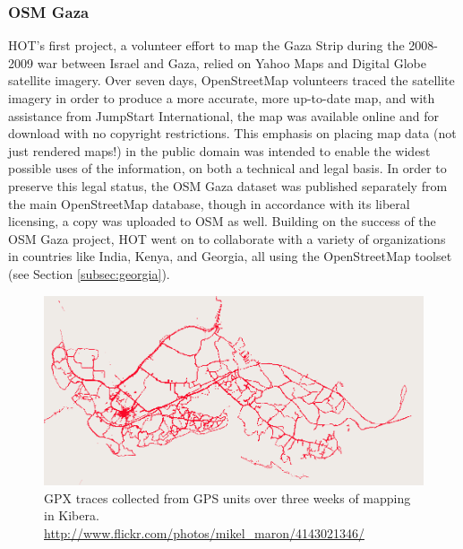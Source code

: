 \documentclass[11pt,oneside,notitlepage]{report}
\begin{document}
{{\subsubsection{OSM Gaza}

\ac{HOT}'s first project, a volunteer effort to map the Gaza Strip during the 2008-2009 war between Israel and Gaza, relied on Yahoo Maps and Digital Globe satellite imagery. Over seven days, OpenStreetMap volunteers traced the satellite imagery in order to produce a more accurate, more up-to-date map, and with assistance from JumpStart International, the map was available online and for download with no copyright restrictions. \cite{chilton-crowdsourcing} This emphasis on placing map data (not just rendered maps!) in the public domain was intended to enable the widest possible uses of the information, on both a technical and legal basis. In order to preserve this legal status, the OSM Gaza dataset was published separately from the main OpenStreetMap database, though in accordance with its liberal licensing, a copy was uploaded to OSM as well. Building on the success of the OSM Gaza project, \ac{HOT} went on to collaborate with a variety of organizations in countries like India, Kenya, and Georgia, all using the OpenStreetMap toolset (see Section \ref{subsec:georgia}). 

\begin{figure}[h]
  \begin{center}
    \includegraphics[width=1\textwidth]{images/kibera-gpx.png}
    \caption{GPX traces collected from GPS units over three weeks of mapping in Kibera. \url{http://www.flickr.com/photos/mikel_maron/4143021346/}}
  \end{center}
\end{figure}

}}
\end{document}
